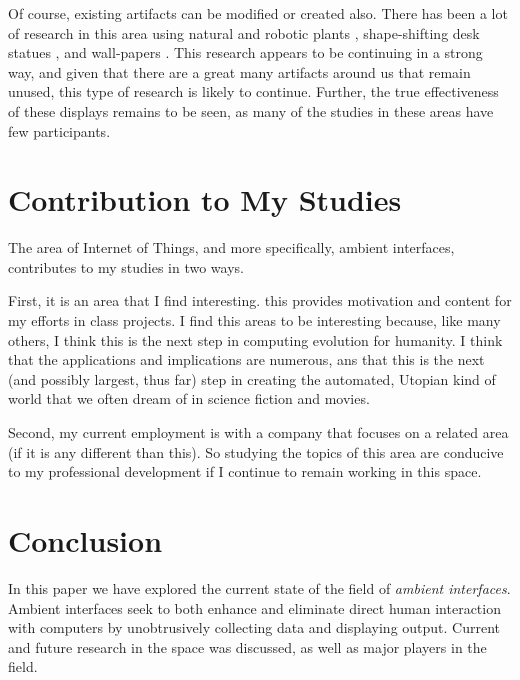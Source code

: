 \documentclass{article}
\begin{document}
Of course, existing artifacts can be modified or created also. There has been a lot of research in this area using natural and robotic plants \cite{7390646}, shape-shifting desk statues \cite{Jafarinaimi:2005:BAD:1056808.1057063}, and wall-papers \cite{Huang:2005:IW:1086057.1086142}. This research appears to be continuing in a strong way, and given that there are a great many artifacts around us that remain unused, this type of research is likely to continue. Further, the true effectiveness of these displays remains to be seen, as many of the studies in these areas have few participants.

%
%
\section{Contribution to My Studies}
The area of Internet of Things, and more specifically, ambient interfaces, contributes to my studies in two ways.

First, it is an area that I find interesting. this provides motivation and content for my efforts in class projects. I find this areas to be interesting because, like many others, I think this is the next step in computing evolution for humanity. I think that the applications and implications are numerous, ans that this is the next (and possibly largest, thus far) step in creating the automated, Utopian kind of world that we often dream of in science fiction and movies.

Second, my current employment is with a company that focuses on a related area (if it is any different than this). So studying the topics of this area are conducive to my professional development if I continue to remain working in this space.

%
%
\section{Conclusion}
In this paper we have explored the current state of the field of \emph{ambient interfaces}. Ambient interfaces seek to both enhance and eliminate direct human interaction with computers by unobtrusively collecting data and displaying output. Current and future research in the space was discussed, as well as major players in the field.

%
%
\printbibliography

%
\end{document}
